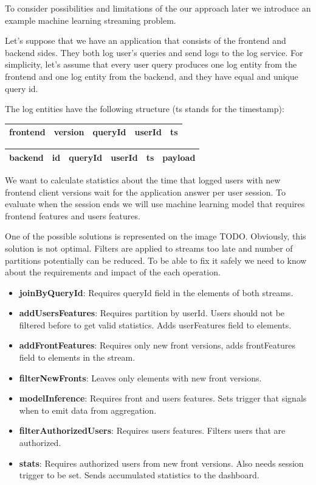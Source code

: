 To consider possibilities and limitations of the our approach later we introduce an example machine learning streaming problem.

Let's suppose that we have an application that consists of the frontend and backend sides.
They both log user's queries and send logs to the log service.
For simplicity, let's assume that every user query produces one log entity from the frontend and one log entity from the backend, and they have equal and unique query id.

The log entities have the following structure (ts stands for the timestamp):

\begin{tabular}{|l|llll|}
    \hline
    \textbf{frontend} & version & queryId & userId & ts \\
    \hline
\end{tabular}

\vspace{0.1em}

\begin{tabular}{|l|lllll|}
    \hline
    \textbf{backend} & id & queryId & userId & ts & payload \\
    \hline
\end{tabular}

We want to calculate statistics about the time that logged users with new frontend client versions wait for the application answer per user session.
To evaluate when the session ends we will use machine learning model that requires frontend features and users features.

One of the possible solutions is represented on the image TODO. %
Obviously, this solution is not optimal.
Filters are applied to streams too late and number of partitions potentially can be reduced.
To be able to fix it safely we need to know about the requirements and impact of the each operation.

\begin{itemize}
    \item \textbf{joinByQueryId}: Requires queryId field in the elements of both streams.
    \item \textbf{addUsersFeatures}: Requires partition by userId. Users should not be filtered before to get valid statistics. Adds userFeatures field to elements.
    \item \textbf{addFrontFeatures}: Requires only new front versions, adds frontFeatures field to elements in the stream.
    \item \textbf{filterNewFronts}: Leaves only elements with new front versions.
    \item \textbf{modelInference}: Requires front and users features. Sets trigger that signals when to emit data from aggregation.
    \item \textbf{filterAuthorizedUsers}: Requires users features. Filters users that are authorized.
    \item \textbf{stats}: Requires authorized users from new front versions. Also needs session trigger to be set. Sends accumulated statistics to the dashboard.
\end{itemize}


